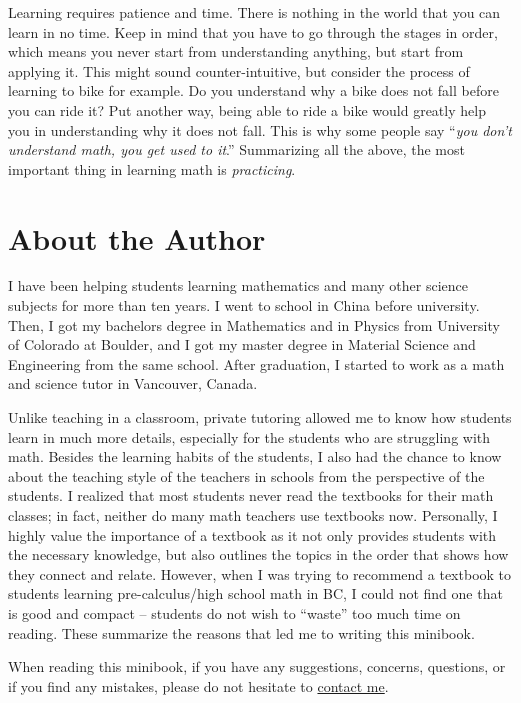 \documentclass[
]{book}
\theoremstyle{definition}
\theoremstyle{definition}
\theoremstyle{definition}
\theoremstyle{definition}
\theoremstyle{remark}
\begin{document}
Learning requires patience and time. There is nothing in the world that you can learn in no time. Keep in mind that you have to go through the stages in order, which means you never start from understanding anything, but start from applying it. This might sound counter-intuitive, but consider the process of learning to bike for example. Do you understand why a bike does not fall before you can ride it? Put another way, being able to ride a bike would greatly help you in understanding why it does not fall. This is why some people say ``\emph{you don't understand math, you get used to it}.'' Summarizing all the above, the most important thing in learning math is \emph{practicing}.

\hypertarget{about-the-author}{%
\section*{About the Author}\label{about-the-author}}

I have been helping students learning mathematics and many other science subjects for more than ten years. I went to school in China before university. Then, I got my bachelors degree in Mathematics and in Physics from University of Colorado at Boulder, and I got my master degree in Material Science and Engineering from the same school. After graduation, I started to work as a math and science tutor in Vancouver, Canada.

Unlike teaching in a classroom, private tutoring allowed me to know how students learn in much more details, especially for the students who are struggling with math. Besides the learning habits of the students, I also had the chance to know about the teaching style of the teachers in schools from the perspective of the students. I realized that most students never read the textbooks for their math classes; in fact, neither do many math teachers use textbooks now. Personally, I highly value the importance of a textbook as it not only provides students with the necessary knowledge, but also outlines the topics in the order that shows how they connect and relate. However, when I was trying to recommend a textbook to students learning pre-calculus/high school math in BC, I could not find one that is good and compact -- students do not wish to ``waste'' too much time on reading. These summarize the reasons that led me to writing this minibook.

When reading this minibook, if you have any suggestions, concerns, questions, or if you find any mistakes, please do not hesitate to \href{https://www.miracleeducation.ca/contact/}{contact me}.
\end{document}
